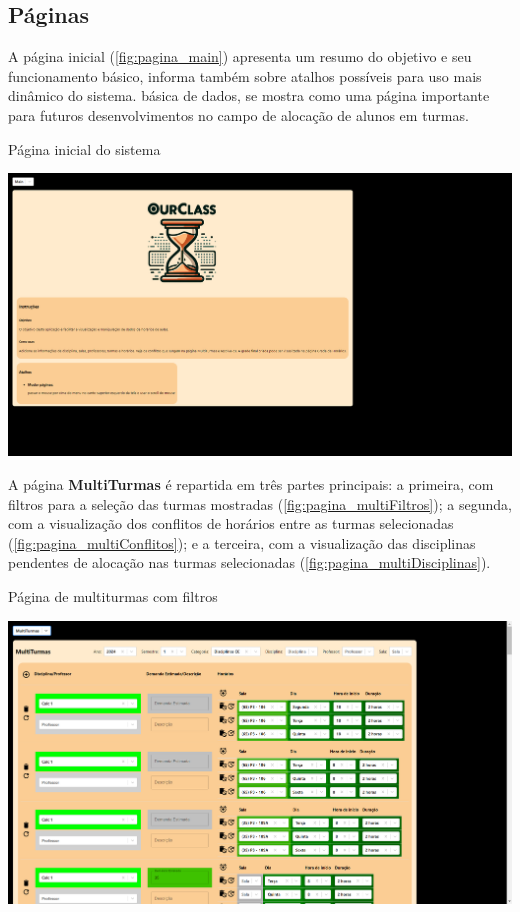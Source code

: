 \subsection{Páginas} \label{ssec:paginas}

A página inicial (\autoref{fig:pagina_main}) apresenta um resumo do objetivo e seu funcionamento básico, informa também sobre atalhos possíveis para uso mais dinâmico do sistema.
básica de dados, se mostra como uma página importante para futuros desenvolvimentos no campo de alocação de alunos em turmas.

\begin{MyCenteredFigure} \caption{Página inicial do sistema} \label{fig:pagina_main}
  \includegraphics[width=\textwidth]{files/img/2.02!7-resultados/1-Main.png}
\end{MyCenteredFigure}

A página \textbf{MultiTurmas} é repartida em três partes principais: a primeira, com filtros para a seleção das turmas mostradas (\autoref{fig:pagina_multiFiltros}); a segunda, com a visualização dos conflitos de horários entre as turmas selecionadas (\autoref{fig:pagina_multiConflitos}); e a terceira, com a visualização das disciplinas pendentes de alocação nas turmas selecionadas (\autoref{fig:pagina_multiDisciplinas}).

\begin{MyCenteredFigure} \caption{Página de multiturmas com filtros} \label{fig:pagina_multiFiltros}
  \includegraphics[width=\textwidth]{files/img/2.02!7-resultados/2-Multiturmas-Filtros.png}
\end{MyCenteredFigure}

